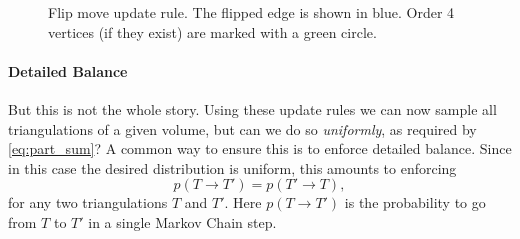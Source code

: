 \begin{figure}
    \centering
    \caption{Flip move update rule. The flipped edge is shown in blue. Order 4 vertices (if they exist) are marked with a green circle.}
    \label{fig:flip_move}
\end{figure}

\paragraph{Detailed Balance}
But this is not the whole story. Using these update rules we can now sample all triangulations of a given volume, but can we do so \emph{uniformly}, as required by \eqref{eq:part_sum}? A common way to ensure this is to enforce detailed balance. Since in this case the desired distribution is uniform, this amounts to enforcing
\begin{equation}
    p(T \to T') = p(T' \to T),
\end{equation}
for any two triangulations $T$ and $T'$. Here $p(T \to T')$ is the probability to go from $T$ to $T'$ in a single Markov Chain step.

